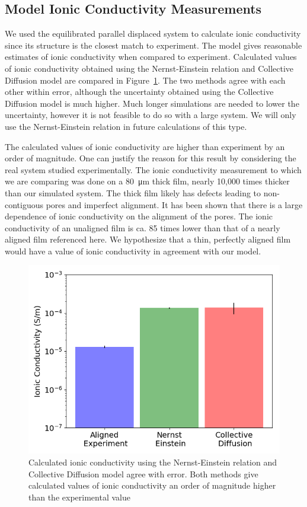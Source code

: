 \documentclass{article}
\begin{document}
  \subsection{Model Ionic Conductivity Measurements}

  We used the equilibrated parallel displaced system to calculate ionic
  conductivity since its structure is the closest match to experiment. The model
  gives reasonable estimates of ionic conductivity when compared to experiment.
  Calculated values of ionic conductivity obtained using the Nernst-Einstein
  relation and Collective Diffusion model are compared in
  Figure~\ref{fig:conductivity}. The two methods agree with each other within
  error, although the uncertainty obtained using the Collective Diffusion model
  is much higher. Much longer simulations are needed to lower the uncertainty,
  however it is not feasible to do so with a large system. We will only use the
  Nernst-Einstein relation in future calculations of this type. 

  The calculated values of ionic conductivity are higher than experiment by an
  order of magnitude. One can justify the reason for this result by considering
  the real system studied experimentally. The ionic conductivity measurement to
  which we are comparing was done on a \SI{80}{\micro\metre} thick film, nearly
  10,000 times thicker than our simulated system. The thick film likely has
  defects leading to non-contiguous pores and imperfect alignment.  It has been
  shown that there is a large dependence of ionic conductivity on the alignment
  of the pores. The ionic conductivity of an unaligned film is ca. 85 times lower
  than that of a nearly aligned film referenced here. We hypothesize that a thin,
  perfectly aligned film would have a value of ionic conductivity in agreement
  with our model.

  \begin{figure}
        \centering
        \includegraphics[width=0.5\linewidth]{IC_offset.png}
        \caption{Calculated ionic conductivity using the Nernst-Einstein relation
        and Collective Diffusion model agree with error. Both methods give calculated
        values of ionic conductivity an order of magnitude higher than the experimental
        value}
        \label{fig:conductivity}
  \end{figure}
\end{document}
